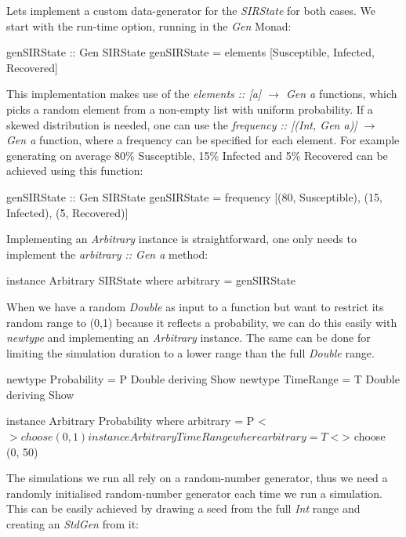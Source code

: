 Lets implement a custom data-generator for the \textit{SIRState} for both cases. We start with the run-time option, running in the \textit{Gen} Monad:

\begin{HaskellCode}
genSIRState :: Gen SIRState
genSIRState = elements [Susceptible, Infected, Recovered]
\end{HaskellCode}

This implementation makes use of the \textit{elements :: [a] $\rightarrow$ Gen a} functions, which picks a random element from a non-empty list with uniform probability. If a skewed distribution is needed, one can use the \textit{frequency :: [(Int, Gen a)] $\rightarrow$ Gen a} function, where a frequency can be specified for each element. For example generating on average 80\% Susceptible, 15\% Infected and 5\% Recovered can be achieved using this function:

\begin{HaskellCode}
genSIRState :: Gen SIRState
genSIRState = frequency [(80, Susceptible), (15, Infected), (5, Recovered)]
\end{HaskellCode}

Implementing an \textit{Arbitrary} instance is straightforward, one only needs to implement the \textit{arbitrary :: Gen a} method:

\begin{HaskellCode}
instance Arbitrary SIRState where
  arbitrary = genSIRState
\end{HaskellCode}

When we have a random \textit{Double} as input to a function but want to restrict its random range to (0,1) because it reflects a probability, we can do this easily with \textit{newtype} and implementing an \textit{Arbitrary} instance. The same can be done for limiting the simulation duration to a lower range than the full \textit{Double} range.

\begin{HaskellCode}
newtype Probability = P Double deriving Show
newtype TimeRange   = T Double deriving Show

instance Arbitrary Probability where
  arbitrary = P <$> choose (0, 1)
  
instance Arbitrary TimeRange where
  arbitrary = T <$> choose (0, 50)
\end{HaskellCode}

The simulations we run all rely on a random-number generator, thus we need a randomly initialised random-number generator each time we run a simulation. This can be easily achieved by drawing a seed from the full \textit{Int} range and creating an \textit{StdGen} from it:

